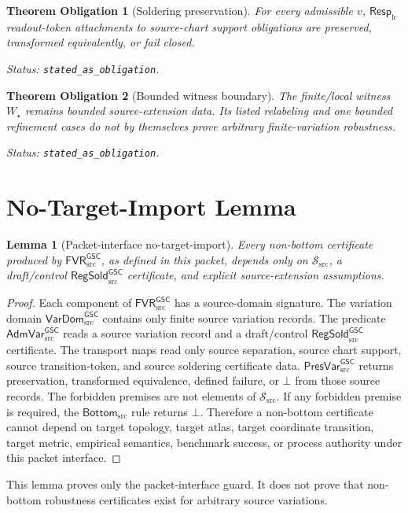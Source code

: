 \documentclass[11pt]{article}
\newcommand{\RespLC}{\mathsf{Resp}_{\mathrm{lc}}}
\newcommand{\RegSold}{\mathsf{RegSold}_{\mathrm{src}}^{\mathsf{GSC}}}
\newcommand{\FVR}{\mathsf{FVR}_{\mathrm{src}}^{\mathsf{GSC}}}
\newcommand{\VarDom}{\mathsf{VarDom}_{\mathrm{src}}^{\mathsf{GSC}}}
\newcommand{\AdmVar}{\mathsf{AdmVar}_{\mathrm{src}}^{\mathsf{GSC}}}
\newcommand{\PresVar}{\mathsf{PresVar}_{\mathrm{src}}^{\mathsf{GSC}}}
\newcommand{\BottomSrc}{\mathsf{Bottom}_{\mathrm{src}}}
\newcommand{\Wstar}{W_{\star}}
\newcommand{\Bot}{\bot}
\newtheorem{obligation}{Theorem Obligation}
\newtheorem{lemma}{Lemma}
\begin{document}
\begin{obligation}[Soldering preservation]
For every admissible \(v\), \(\RespLC\) readout-token attachments to
source-chart support obligations are preserved, transformed equivalently, or
fail closed.

Status: \texttt{stated\_as\_obligation}.
\end{obligation}

\begin{obligation}[Bounded witness boundary]
The finite/local witness \(\Wstar\) remains bounded source-extension data. Its
listed relabeling and one bounded refinement cases do not by themselves prove
arbitrary finite-variation robustness.

Status: \texttt{stated\_as\_obligation}.
\end{obligation}

\section{No-Target-Import Lemma}

\begin{lemma}[Packet-interface no-target-import]
Every non-bottom certificate produced by \(\FVR\), as defined in this packet,
depends only on \(\mathcal{S}_{\mathrm{src}}\), a draft/control \(\RegSold\)
certificate, and explicit source-extension assumptions.
\end{lemma}

\begin{proof}
Each component of \(\FVR\) has a source-domain signature. The variation domain
\(\VarDom\) contains only finite source variation records. The predicate
\(\AdmVar\) reads a source variation record and a draft/control \(\RegSold\)
certificate. The transport maps read only source separation, source chart
support, source transition-token, and source soldering certificate data.
\(\PresVar\) returns preservation, transformed equivalence, defined failure,
or \(\Bot\) from those source records. The forbidden premises are not elements
of \(\mathcal{S}_{\mathrm{src}}\). If any forbidden premise is required, the
\(\BottomSrc\) rule returns \(\Bot\). Therefore a non-bottom certificate
cannot depend on target topology, target atlas, target coordinate transition,
target metric, empirical semantics, benchmark success, or process authority
under this packet interface.
\end{proof}

This lemma proves only the packet-interface guard. It does not prove that
non-bottom robustness certificates exist for arbitrary source variations.
\end{document}
